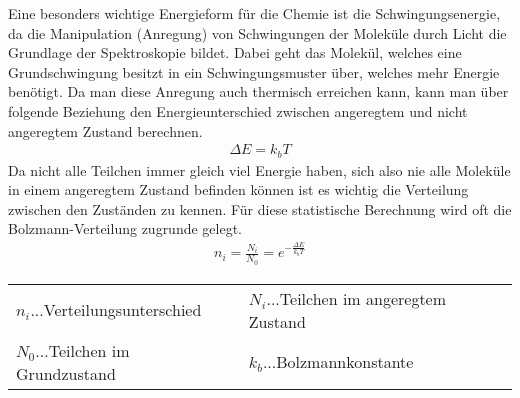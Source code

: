 Eine besonders wichtige Energieform für die Chemie ist die Schwingungsenergie, da die Manipulation (Anregung) von Schwingungen der Moleküle durch
Licht die Grundlage der Spektroskopie bildet. Dabei geht das Molekül, welches eine Grundschwingung besitzt in ein Schwingungsmuster über, welches 
mehr Energie benötigt. Da man diese Anregung auch thermisch erreichen kann, kann man über folgende Beziehung den Energieunterschied zwischen 
angeregtem und nicht angeregtem Zustand berechnen.
\begin{align}
    \Delta E = k_b T
\end{align}
Da nicht alle Teilchen immer gleich viel Energie haben, sich also nie alle Moleküle in einem angeregtem Zustand befinden können ist es wichtig
die Verteilung zwischen den Zuständen zu kennen. Für diese statistische Berechnung wird oft die Bolzmann-Verteilung zugrunde gelegt.
\begin{align}
    n_i = \frac{N_i}{N_0} = e^{-\frac{\Delta E}{k_b T}}
\end{align} 

\begin{table}[H]
    \centering
    \begin{tabular}{ll}
        $n_i$...Verteilungsunterschied & $N_i$...Teilchen im angeregtem Zustand \\
        $N_0$...Teilchen im Grundzustand & $k_b$...Bolzmannkonstante
    \end{tabular}
\end{table}